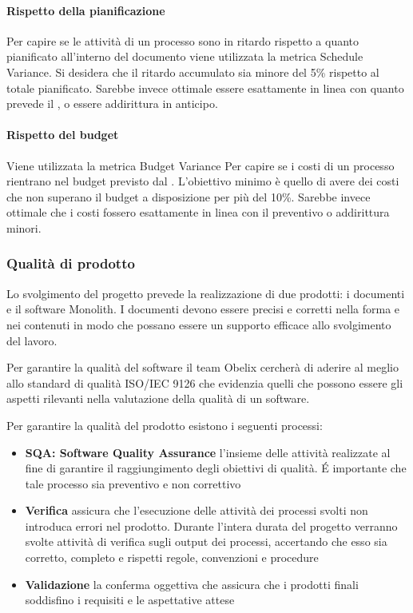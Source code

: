 \paragraph{Rispetto della pianificazione}
Per capire se le attività di un processo sono in ritardo rispetto a
quanto pianificato all'interno del documento \emph{\pianodiprogetto} viene utilizzata la metrica Schedule Variance. Si desidera che
il ritardo accumulato sia minore del 5\% rispetto al totale
pianificato. Sarebbe invece ottimale essere esattamente in linea con
quanto prevede il \emph{\pianodiprogetto}, o essere addirittura
in anticipo.

\paragraph{Rispetto del budget}
Viene utilizzata la metrica Budget Variance Per capire se i costi di
un processo rientrano nel budget previsto dal \emph{\pianodiprogetto}.
L'obiettivo minimo è quello di avere dei costi che non superano il
budget a disposizione per più del 10\%. Sarebbe invece ottimale che i
costi fossero esattamente in linea con il preventivo o addirittura
minori.

\subsubsection{Qualità di prodotto}
Lo svolgimento del progetto prevede la realizzazione di due prodotti:
i documenti e il software Monolith.
I documenti devono essere precisi e corretti nella forma e nei
contenuti in modo che possano essere un supporto efficace allo
svolgimento del lavoro.

Per garantire la qualità del software il team Obelix cercherà
di aderire al meglio allo standard di qualità ISO/IEC 9126 che
evidenzia quelli che possono essere gli aspetti rilevanti nella
valutazione della qualità di un software.

Per garantire la qualità del prodotto esistono i seguenti processi:
\begin{itemize}
\item \textbf{SQA: Software Quality Assurance} l'insieme delle
  attività realizzate al fine di garantire il raggiungimento degli
  obiettivi di qualità. \'E importante che tale processo sia
  preventivo e non correttivo
\item \textbf{Verifica} assicura che l'esecuzione delle attività dei
  processi svolti non introduca errori
  nel prodotto. Durante l'intera durata del progetto verranno svolte
  attività di verifica sugli
  output dei processi, accertando che esso sia corretto, completo e
  rispetti regole, convenzioni
  e procedure
\item \textbf{Validazione} la conferma oggettiva che assicura che i prodotti finali soddisfino i requisiti
  e le aspettative attese
\end{itemize}

